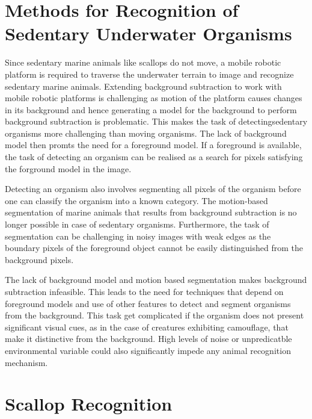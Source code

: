 \documentclass {udthesis}
\begin{document}

\section{Methods for Recognition of Sedentary Underwater Organisms}

Since sedentary marine animals like scallops do not move, a mobile robotic platform is required to traverse the underwater terrain to image and recognize sedentary marine animals. Extending background subtraction to work with mobile robotic platforms is challenging as motion of the platform causes changes in its background and hence generating a model for the background to perform background subtraction is problematic. This makes the task of detectingsedentary organisms more challenging than moving organisms. The lack of background model then promts the need for a foreground model. If a foreground is available, the task of detecting an organism can be realised as a search for pixels satisfying the forground model in the image.

Detecting an organism also involves segmenting all pixels of the organism before one can classify the organism into a known category. 
The motion-based segmentation of marine animals that results from background subtraction is no longer possible in case of sedentary organisms. 
Furthermore, the task of segmentation can be challenging in noisy images with weak edges as the boundary pixels of the foreground object cannot be easily distinguished from the background pixels.

The lack of background model and motion based segmentation makes background subtraction infeasible. This leads to the need for techniques that depend on foreground models and use of other features to detect and segment organisms from the background. This task get complicated if the organism does not present significant visual cues, as in the case of creatures exhibiting camouflage, that make it distinctive from the background. High levels of noise or unpredicatble environmental variable could also significantly impede any animal recognition mechanism.


\section{Scallop Recognition}
\end{document}
